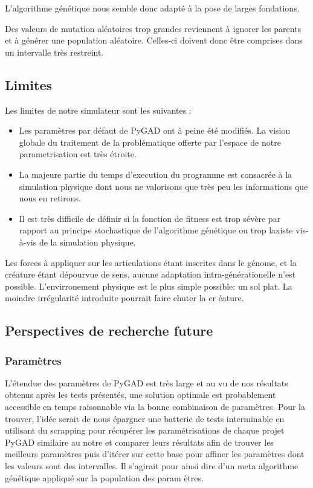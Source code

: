 \documentclass[journal, a4paper]{IEEEtran}
\begin{document}
	L'algorithme génétique nous semble donc adapté à la pose de
	larges fondations.

	Des valeurs de mutation aléatoires trop grandes reviennent à
	ignorer les parents et à générer une population aléatoire.
	Celles-ci doivent donc être comprises dans un
	intervalle très restreint.

\subsection{Limites}\label{subsec:limites}
	Les limites de notre simulateur sont les suivantes :
	\begin{itemize}
		\item Les paramètres par défaut de PyGAD ont à peine été
		modifiés. La vision globale du traitement de la problématique
		offerte par l'espace de notre parametrisation est très étroite.
		\item La majeure partie du temps d'execution du programme est
		consacrée à la simulation physique dont nous ne valorisons que
		très peu les informations que nous en retirons.
		\item Il est très difficile de définir si la fonction de fitness
		est trop sévère par rapport au principe stochastique de l'algorithme
		génétique ou trop laxiste vis-à-vis de la simulation physique.
	\end{itemize}
	Les forces à appliquer sur les articulations étant inscrites dans
	le génome, et la créature étant dépourvue de sens, aucune adaptation
	intra-générationelle n'est possible.
	L'envirronement physique est le plus simple possible: un sol plat.
	La moindre irrégularité introduite pourrait faire chuter la cr
	éature.


\subsection{Perspectives de recherche future}\label{subsec:perspectives-de-recherche-future}

\subsubsection{Paramètres}
	L'étendue des paramètres de PyGAD est très large et au vu de nos
	résultats obtenus après les tests présentés,
	une solution
	optimale est probablement accessible en temps raisonnable via
	la bonne combinaison de paramètres.
	Pour la trouver, l'idée serait de nous épargner une batterie de
	tests interminable en
	utilisant du scrapping pour récupérer les paramétrisations de chaque
	projet PyGAD similaire au notre et comparer leurs résultats afin de
	trouver
	les
	meilleurs paramètres puis d'itérer sur cette base pour affiner
	les paramètres dont les valeurs sont des intervalles. Il s'agirait
	pour ainsi dire d'un meta algorithme génétique appliqué sur
	la population des param
	ètres.
\end{document}
